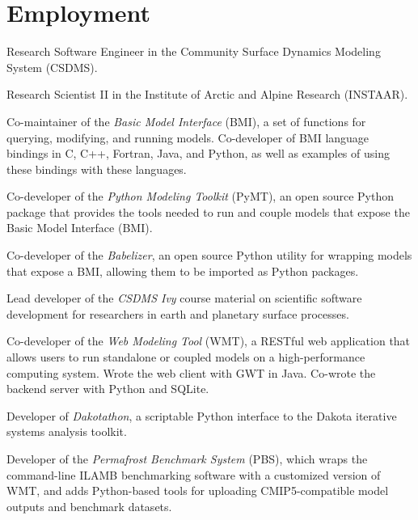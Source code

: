 \section{Employment}
\vspace{0.5em}

\begin{compactitem}[\itembullet]
  \item
    Research Software Engineer in the Community
    Surface Dynamics Modeling System (CSDMS).
    \item
    Research Scientist II in
    the Institute of Arctic and Alpine Research (INSTAAR).
  \item
    Co-maintainer of the \textit{Basic Model Interface} (BMI), a set of functions
    for querying, modifying, and running models. Co-developer of BMI language
    bindings in C, C++, Fortran, Java, and Python, as well as examples of using
    these bindings with these languages.
  \item
    Co-developer of the \textit{Python Modeling Toolkit} (PyMT), an
    open source Python package that provides the tools needed to run
    and couple models that expose the Basic Model Interface (BMI).
  \item
    Co-developer of the \textit{Babelizer}, an open source Python utility for
    wrapping models that expose a BMI, allowing them to be imported as Python
    packages.
  \item
    Lead developer of the \textit{CSDMS Ivy} course material on scientific software
    development for researchers in earth and planetary surface processes.
  \item
    Co-developer of the \textit{Web Modeling Tool} (WMT), a RESTful
    web application that allows users to run standalone or coupled
    models on a high-performance computing system. Wrote the web
    client with GWT in Java. Co-wrote the backend server with Python
    and SQLite.
  \item
    Developer of \textit{Dakotathon}, a scriptable Python interface to
    the Dakota iterative systems analysis toolkit.
  \item
    Developer of the \textit{Permafrost Benchmark System} (PBS), which
    wraps the command-line ILAMB benchmarking software with a
    customized version of WMT, and adds Python-based tools for
    uploading CMIP5-compatible model outputs and benchmark datasets.
  \item

\end{compactitem}
